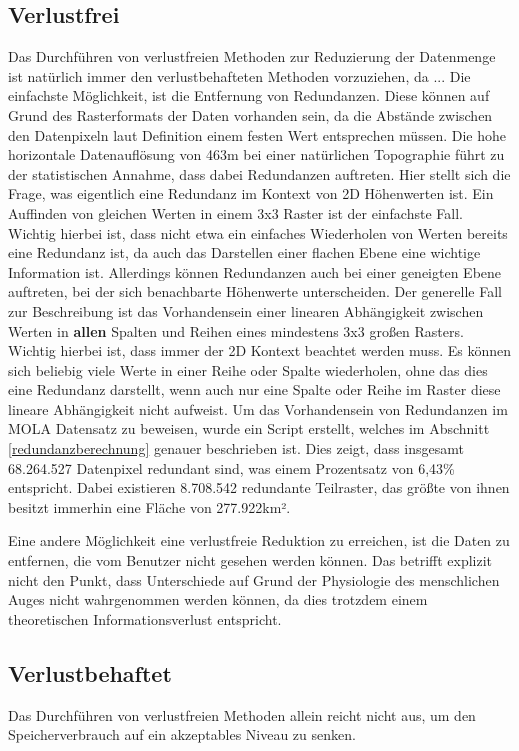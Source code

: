 \subsection{Verlustfrei}
Das Durchführen von verlustfreien Methoden zur Reduzierung der Datenmenge ist natürlich immer den verlustbehafteten Methoden vorzuziehen, da ...
Die einfachste Möglichkeit, ist die Entfernung von Redundanzen. Diese können auf Grund des Rasterformats der Daten vorhanden sein, da die Abstände zwischen den Datenpixeln laut Definition einem festen Wert entsprechen müssen. Die hohe horizontale Datenauflösung von 463m bei einer natürlichen Topographie führt zu der statistischen Annahme, dass dabei Redundanzen auftreten. Hier stellt sich die Frage, was eigentlich eine Redundanz im Kontext von 2D Höhenwerten ist. Ein Auffinden von gleichen Werten in einem 3x3 Raster ist der einfachste Fall. Wichtig hierbei ist, dass nicht etwa ein einfaches Wiederholen von Werten bereits eine Redundanz ist, da auch das Darstellen einer flachen Ebene eine wichtige Information ist. Allerdings können Redundanzen auch bei einer geneigten Ebene auftreten, bei der sich benachbarte Höhenwerte unterscheiden. Der generelle Fall zur Beschreibung ist das Vorhandensein einer linearen Abhängigkeit zwischen Werten in \textbf{allen} Spalten und Reihen eines mindestens 3x3 großen Rasters\cite{topoDataReduction}. Wichtig hierbei ist, dass immer der 2D Kontext beachtet werden muss. Es können sich beliebig viele Werte in einer Reihe oder Spalte wiederholen, ohne das dies eine Redundanz darstellt, wenn auch nur eine Spalte oder Reihe im Raster diese lineare Abhängigkeit nicht aufweist. Um das Vorhandensein von Redundanzen im MOLA Datensatz zu beweisen, wurde ein Script erstellt, welches im Abschnitt \ref{redundanzberechnung} genauer beschrieben ist. Dies zeigt, dass insgesamt 68.264.527 Datenpixel redundant sind, was einem Prozentsatz von 6,43\% entspricht. Dabei existieren 8.708.542 redundante Teilraster, das größte von ihnen besitzt immerhin eine Fläche von 277.922km².

Eine andere Möglichkeit eine verlustfreie Reduktion zu erreichen, ist die Daten zu entfernen, die vom Benutzer nicht gesehen werden können. Das betrifft explizit nicht den Punkt, dass Unterschiede auf Grund der Physiologie des menschlichen Auges nicht wahrgenommen werden können, da dies trotzdem einem theoretischen Informationsverlust entspricht.

\subsection{Verlustbehaftet}
Das Durchführen von verlustfreien Methoden allein reicht nicht aus, um den Speicherverbrauch auf ein akzeptables Niveau zu senken.

